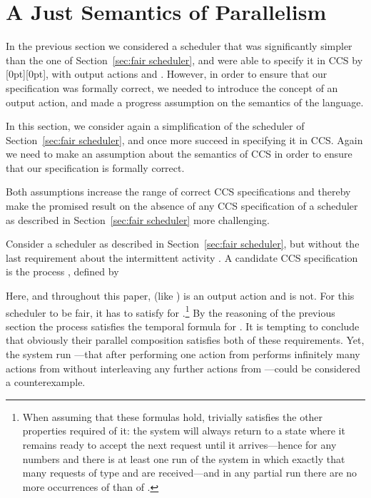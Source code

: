 \documentclass[smallcondensed]{svjour3}
\newcommand{\plat}[1]{\raisebox{0pt}[0pt][0pt]{#1}}  \def\precond#1{{\vphantom{#1}}^\bullet #1}
\newcommand{\Sect}[1]{Section~\ref{sec:#1}}
\newcounter {part}
\begin{document}
\section{A Just Semantics of Parallelism}\label{sec:justness}


In the previous section we considered a scheduler\vspace{2pt} that was significantly simpler than the one of
\Sect{fair scheduler}, and were able to specify it in CCS by \plat{}, with output actions  and . 
However, in order to ensure that our
specification was formally correct, we needed to introduce the concept of an output action, and made
a progress assumption on the semantics of the language.

In this section, we consider again a simplification of the scheduler of \Sect{fair scheduler}, and
once more succeed in specifying it in CCS. Again we need to make an assumption about the semantics
of CCS in order to ensure that our specification is formally correct.

Both assumptions increase the range of correct CCS specifications and thereby make the promised
result on the absence of any CCS specification of a scheduler as described in \Sect{fair scheduler}
more challenging.

Consider a scheduler as described in \Sect{fair scheduler}, but without the last requirement about
the intermittent activity .  A candidate CCS specification is the process , defined by\vspace{-2ex}

Here, and throughout this paper,  (like ) is an output action and  is not.
For this scheduler to be fair, it has to satisfy
 for .\footnote{When assuming that these formulas hold,
   trivially satisfies the other properties required of it:
  the system will always return to a state where it remains ready to
  accept the next request  until it arrives---hence for any numbers  and
   there is at least one run of the system in which exactly that many
  requests of type  and  are received---and in any partial run there are no more
  occurrences of  than of .}
By the reasoning of the previous section the process
 satisfies the temporal formula  for .
It is tempting to conclude that obviously their parallel composition  satisfies both of
these requirements. Yet, the system run \linebreak[1]---that after performing one action
from  performs infinitely many actions from  without interleaving any further actions from
---could be considered a counterexample.
\end{document}
